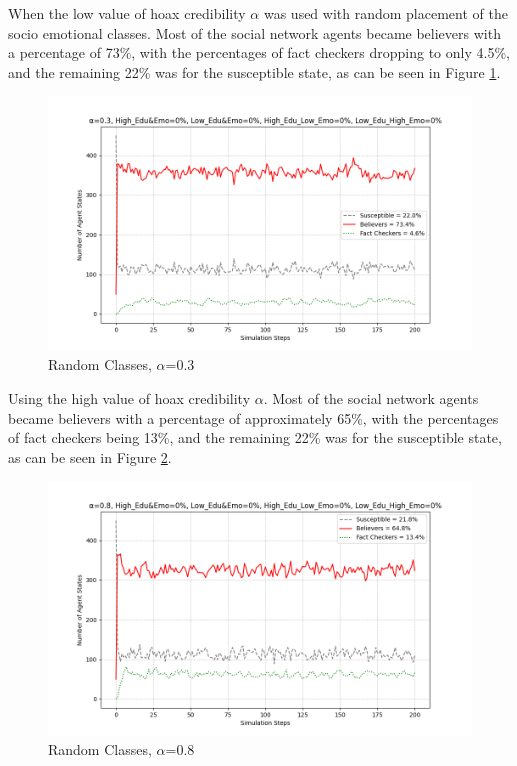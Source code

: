 \documentclass[twocolumn, a4paper, 12pt]{article}
\begin{document}
When the low value of hoax credibility $\alpha$ was used with random placement of the socio emotional classes. Most of the social network agents became believers with a percentage of 73\%, with the percentages of fact checkers dropping to only 4.5\%, and the remaining 22\% was for the susceptible state, as can be seen in Figure \ref{fig:1}.

\begin{figure}[H]
    \centering
    \includegraphics[width=1\linewidth]{0.3_alpha_random.png}
    \caption{Random Classes, $\alpha$=0.3}
    \label{fig:1}
\end{figure}

Using the high value of hoax credibility $\alpha$. Most of the social network agents became believers with a percentage of approximately 65\%, with the percentages of fact checkers being 13\%, and the remaining 22\% was for the susceptible state, as can be seen in Figure \ref{fig:2}.

\begin{figure}[H]
    \centering
    \includegraphics[width=1\linewidth]{0.8_alpha_random.png}
    \caption{Random Classes, $\alpha$=0.8}
    \label{fig:2}
\end{figure}
\end{document}
